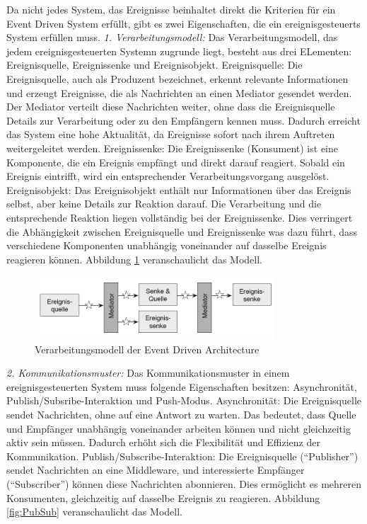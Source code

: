 \documentclass[a4paper,12pt]{article}
\begin{document}
Da nicht jedes System, das Ereignisse beinhaltet direkt die Kriterien für ein Event Driven System erfüllt, gibt es zwei Eigenschaften, die ein ereignisgesteuerts System erfüllen muss. \newline
\textit{1. Verarbeitungsmodell:} \newline
Das Verarbeitungsmodell, das jedem ereignisgesteuerten Systemn zugrunde liegt, besteht aus drei ELementen: Ereignisquelle, Ereignissenke und Ereignisobjekt.
Ereignisquelle: Die Ereignisquelle, auch als Produzent bezeichnet, erkennt relevante Informationen und erzeugt Ereignisse, die als Nachrichten an einen Mediator gesendet werden. Der Mediator verteilt diese Nachrichten weiter, ohne dass die Ereignisquelle Details zur Verarbeitung oder zu den Empfängern kennen muss. Dadurch erreicht das System eine hohe Aktualität, da Ereignisse sofort nach ihrem Auftreten weitergeleitet werden.
Ereignissenke: Die Ereignissenke (Konsument) ist eine Komponente, die ein Ereignis empfängt und direkt darauf reagiert. Sobald ein Ereignis eintrifft, wird ein entsprechender Verarbeitungsvorgang ausgelöst.
Ereignisobjekt: Das Ereignisobjekt enthält nur Informationen über das Ereignis selbst, aber keine Details zur Reaktion darauf. Die Verarbeitung und die entsprechende Reaktion liegen vollständig bei der Ereignissenke. Dies verringert die Abhängigkeit zwischen Ereignisquelle und Ereignissenke was dazu führt, dass verschiedene Komponenten unabhängig voneinander auf dasselbe Ereignis reagieren können. \cite[S. 51f]{Bruns2010} \newline
Abbildung \ref{fig:Verarbeitungsmodell} veranschaulicht das Modell. 

\begin{figure}[h]
    \centering
    \includegraphics[width=0.8\textwidth]{images/Verarbeitungsmodell.png}
    \caption{Verarbeitungsmodell der Event Driven Architecture \cite[S. 52]{Bruns2010}}
    \label{fig:Verarbeitungsmodell}
\end{figure}

\textit{2. Kommunikationsmuster:} \newline
Das Kommunikationsmuster in einem ereignisgesteuerten System muss folgende Eigenschaften besitzen: Asynchronität, Publish/Subsribe-Interaktion und Push-Modus.
Asynchronität: Die Ereignisquelle sendet Nachrichten, ohne auf eine Antwort zu warten. Das bedeutet, dass Quelle und Empfänger unabhängig voneinander arbeiten können und nicht gleichzeitig aktiv sein müssen. Dadurch erhöht sich die Flexibilität und Effizienz der Kommunikation.
Publish/Subscribe-Interaktion: Die Ereignisquelle (“Publisher”) sendet Nachrichten an eine Middleware, und interessierte Empfänger (“Subscriber”) können diese Nachrichten abonnieren. Dies ermöglicht es mehreren Konsumenten, gleichzeitig auf dasselbe Ereignis zu reagieren.
Abbildung \ref{fig:PubSub} veranschaulicht das Modell.
\end{document}
